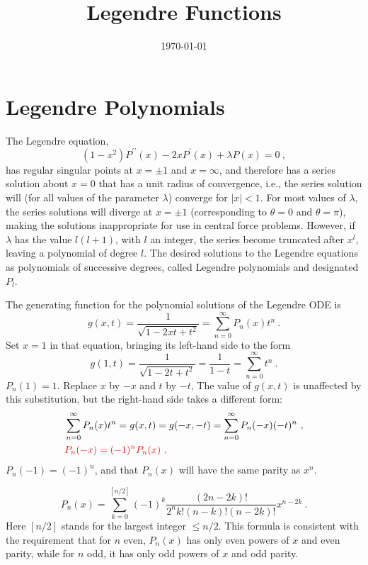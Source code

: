 \documentclass[12pt,a4paper]{article}
\title{Legendre Functions}
\author{}
\date{\today}
\begin{document}
\maketitle


\section{Legendre Polynomials}
\cite{arfken} The Legendre equation,
\begin{equation}
(1-x^2) P^{\prime \prime}(x) - 2x P^\prime(x) +\lambda P(x)  = 0 ~,
\end{equation}
has regular singular points at $x = \pm 1$ and $x = \infty$, and therefore has a series solution about $x = 0$ that has a unit radius of convergence, i.e., the series solution will (for all values of the parameter $\lambda$) converge for $|x| < 1$. For most values of $\lambda$, the series solutions will diverge at $x = \pm 1$ (corresponding to $\theta = 0$ and $\theta = \pi$), making the solutions inappropriate for use in central force problems. However, if $\lambda$ has the value $l(l + 1)$, with $l$ an integer, the series become truncated after $x^l$, leaving a polynomial of degree $l$. The desired solutions to the Legendre equations as polynomials of successive degrees, called Legendre polynomials and designated $P_l$.  

The generating function for the polynomial solutions of the Legendre ODE is
\begin{equation}
g(x, t) = \dfrac{1}{\sqrt{1-2xt+t^2}} = \sum_{n=0}^\infty P_n(x) t^n ~.
\end{equation}
Set $x = 1$ in that equation, bringing its left-hand side to the form
\begin{equation}
g(1, t) =  \dfrac{1}{\sqrt{1-2t+t^2}} = \dfrac{1}{1-t} = \sum_{n=0}^\infty t^n ~.
\end{equation}
$P_n (1) = 1$. Replace $x$ by $-x$ and $t$ by $-t$, The value of $g(x,t)$ is unaffected by this substitution, but the right-hand side takes a different form:
\begin{align}
& \sum_{n=0}^\infty P_n(x) t^n = g(x,t) = g(-x, -t) = \sum_{n=0}^\infty P_n(-x) (-t)^n ~, \\
& \color{red} P_n(-x) = (-1)^n P_n(x) ~,
\end{align}
$P_n(-1) = (-1)^n$, and that $P_n(x)$ will have the same parity as $x^n$.




\begin{equation}
P_n(x) = \sum_{k=0}^{[n/2]} (-1)^k \dfrac{(2n-2k)!}{2^n k! (n-k)! (n-2k)!} x^{n-2k} ~.
\end{equation}
Here $[n/2]$ stands for the largest integer $\leqslant n/2$. This formula is consistent with the requirement that for $n$ even, $P_n(x)$ has only even powers of $x$ and even parity, while for $n$ odd, it has only odd powers of $x$ and odd parity.
\end{document}
